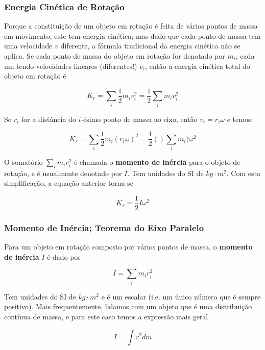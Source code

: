 \subsubsection{Energia Cinética de Rotação}
Porque a constituição de um objeto em rotação é feita de vários pontos de massa em movimento, este tem energia cinética; mas dado que cada ponto de massa tem uma velocidade $v$ diferente, a fórmula tradicional da energia cinética não se aplica. Se cada ponto de massa do objeto em rotação for denotado por $m_i$, cada um tendo velocidades lineares (diferentes!) $v_i$, então a energia cinética total do objeto em rotação é

\begin{equation}
    K_{r}=\sum_{i}\frac{1}{2}m_iv_i^2=\frac{1}{2}\sum_i m_iv_i^2
\end{equation}

Se $r_i$ for a distância do $i$-ésimo ponto de massa ao eixo, então $v_i=r_i\omega$ e temos:

\begin{equation}
    K_{r}=\sum_{i}\frac{1}{2}m_i(r_i\omega)^2=\frac{1}{2}()\sum_i m_i)\omega^2
\end{equation}

O somatório $\sum_i m_ir_i^2$ é chamada o \textbf{momento de inércia} para o objeto de rotação, e é usualmente denotado por $I$. Tem unidades do SI de $kg\cdot m^2$. Com esta simplificação, a equação anterior torna-se

\begin{equation}
    K_{r}=\frac{1}{2}I\omega^2
\end{equation}

\subsubsection{Momento de Inércia; Teorema do Eixo Paralelo}
Para um objeto em rotação composto por vários pontos de massa, o \textbf{momento de inércia} $I$ é dado por

\begin{equation}
    I=\sum_i m_ir_i^2
\end{equation}

Tem unidades do SI de $kg\cdot m^2$ e é um escalar (i.e. um único número que é sempre positivo). Mais frequentemente, lidamos com um objeto que é uma distribuição contínua de massa, e para este caso temos a expressão mais geral

\begin{equation}
    I=\int r^2dm
\end{equation}

